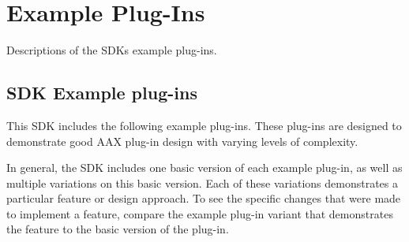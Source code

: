 \hypertarget{a00848}{}\section{Example Plug-\/\+Ins}
\label{a00848}
Descriptions of the S\+DK\textquotesingle{}s example plug-\/ins. 

\hypertarget{a00848_examples}{}\subsection{S\+D\+K Example plug-\/ins}\label{a00848_examples}
This S\+DK includes the following example plug-\/ins. These plug-\/ins are designed to demonstrate good A\+AX plug-\/in design with varying levels of complexity.

In general, the S\+DK includes one basic version of each example plug-\/in, as well as multiple variations on this basic version. Each of these variations demonstrates a particular feature or design approach. To see the specific changes that were made to implement a feature, compare the example plug-\/in variant that demonstrates the feature to the basic version of the plug-\/in.

